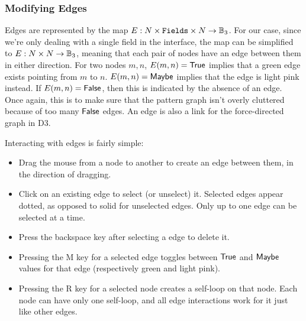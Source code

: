 \subsubsection{Modifying Edges}
Edges are represented by the map $E: N \times \mathtt{Fields} \times N \to \mathbb{B}_3$. For our case, since we're only dealing with a single field in the interface, the map can be simplified to $E: N \times N \to \mathbb{B}_3$, meaning that each pair of nodes have an edge between them in either direction. For two nodes $m, n$, $E(m, n) = \mathsf{True}$ implies that a green edge exists pointing from $m$ to $n$. $E(m, n) = \mathsf{Maybe}$ implies that the edge is light pink instead. If $E(m, n) = \mathsf{False}$, then this is indicated by the absence of an edge. Once again, this is to make sure that the pattern graph isn't overly cluttered because of too many $\mathsf{False}$ edges. An edge is also a link for the force-directed graph in D3.

Interacting with edges is fairly simple:
\begin{itemize}
  \item Drag the mouse from a node to another to create an edge between them, in the direction of dragging.
  \item Click on an existing edge to select (or unselect) it. Selected edges appear dotted, as opposed to solid for unselected edges. Only up to one edge can be selected at a time.
  \item Press the backspace key after selecting a edge to delete it.
  \item Pressing the M key for a selected edge toggles between $\mathsf{True}$ and $\mathsf{Maybe}$ values for that edge (respectively green and light pink).
  \item Pressing the R key for a selected node creates a self-loop on that node. Each node can have only one self-loop, and all edge interactions work for it just like other edges.
\end{itemize}

